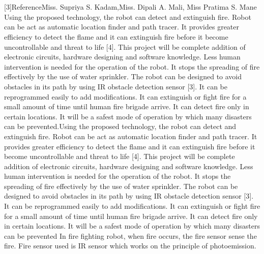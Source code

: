 \documentclass[12pt,a4paper]{report}
\begin{document}
\\\\
\hspace*{1cm}[3]ReferenceMiss. Supriya S. Kadam,Miss. Dipali A. Mali, Miss Pratima S. Mane 
Using the proposed technology, the robot can
detect and extinguish fire. Robot can be act as automatic
location finder and path tracer. It provides greater
efficiency to detect the flame and it can extinguish fire before
it become uncontrollable and threat to life [4]. This project
will be complete addition of electronic circuits, hardware
designing and software knowledge. Less human
intervention is needed for the operation of the robot. It
stops the spreading of fire effectively by the use of water
sprinkler. The robot can be designed to avoid obstacles in
its path by using IR obstacle detection sensor [3].
It can be reprogrammed easily to add
modifications. It can extinguish or fight fire for a small
amount of time until human fire brigade arrive. It can
detect fire only in certain locations. It will be a safest mode
of operation by which many disasters can be prevented.Using the proposed technology, the robot can
detect and extinguish fire. Robot can be act as automatic
location finder and path tracer. It provides greater
efficiency to detect the flame and it can extinguish fire before
it become uncontrollable and threat to life [4]. This project
will be complete addition of electronic circuits, hardware
designing and software knowledge. Less human
intervention is needed for the operation of the robot. It
stops the spreading of fire effectively by the use of water
sprinkler. The robot can be designed to avoid obstacles in
its path by using IR obstacle detection sensor [3].
It can be reprogrammed easily to add
modifications. It can extinguish or fight fire for a small
amount of time until human fire brigade arrive. It can
detect fire only in certain locations. It will be a safest mode
of operation by which many disasters can be prevented
In fire fighting robot, when fire occurs, the
fire sensor sense the fire. Fire sensor used is IR sensor
which works on the principle of photoemission.\\\\










 
 
\end{document}
